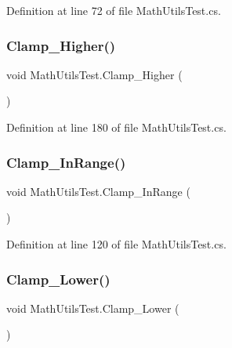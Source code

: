Definition at line 72 of file Math\+Utils\+Test.\+cs.

\mbox{\label{class_math_utils_test_ae689520235fddf0156df1adeba2e1002}} 
\subsubsection{\texorpdfstring{Clamp\+\_\+\+Higher()}{Clamp\_Higher()}}
{\footnotesize\ttfamily void Math\+Utils\+Test.\+Clamp\+\_\+\+Higher (\begin{DoxyParamCaption}{ }\end{DoxyParamCaption})}



Definition at line 180 of file Math\+Utils\+Test.\+cs.

\mbox{\label{class_math_utils_test_a6f3d4029313d99797fc2f84ffc483d80}} 
\subsubsection{\texorpdfstring{Clamp\+\_\+\+In\+Range()}{Clamp\_InRange()}}
{\footnotesize\ttfamily void Math\+Utils\+Test.\+Clamp\+\_\+\+In\+Range (\begin{DoxyParamCaption}{ }\end{DoxyParamCaption})}



Definition at line 120 of file Math\+Utils\+Test.\+cs.

\mbox{\label{class_math_utils_test_a3d1816b2cc2aea8d79831a6b01af292f}} 
\subsubsection{\texorpdfstring{Clamp\+\_\+\+Lower()}{Clamp\_Lower()}}
{\footnotesize\ttfamily void Math\+Utils\+Test.\+Clamp\+\_\+\+Lower (\begin{DoxyParamCaption}{ }\end{DoxyParamCaption})}



